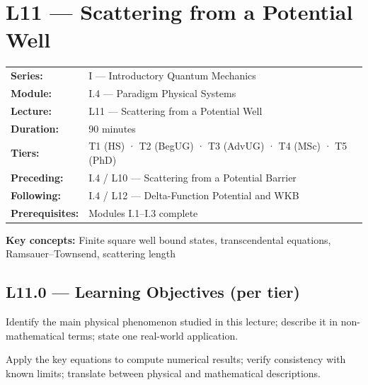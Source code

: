 \renewcommand{\lectureCode}{I.4 / L11}

\section*{L11 — Scattering from a Potential Well}
\label{sec:L11}

\begin{tcolorbox}[lecturebox, title={Module I.4 / L11 — Metadata}]
\begin{tabular}{@{}ll@{}}
\textbf{Series:}    & I — Introductory Quantum Mechanics \\
\textbf{Module:}    & I.4 — Paradigm Physical Systems \\
\textbf{Lecture:}   & L11 — Scattering from a Potential Well \\
\textbf{Duration:}  & 90 minutes \\
\textbf{Tiers:}     & T1 (HS) · T2 (BegUG) · T3 (AdvUG) · T4 (MSc) · T5 (PhD) \\
\textbf{Preceding:} & I.4 / L10 — Scattering from a Potential Barrier \\
\textbf{Following:} & I.4 / L12 — Delta-Function Potential and WKB \\
\textbf{Prerequisites:} & Modules I.1–I.3 complete \\
\end{tabular}

\medskip
\textbf{Key concepts:} Finite square well bound states, transcendental equations, Ramsauer–Townsend, scattering length
\end{tcolorbox}

\subsection*{L11.0 — Learning Objectives (per tier)}
\label{sec:L11.0}

\quad
Identify the main physical phenomenon studied in this lecture; describe it in
non-mathematical terms; state one real-world application.

\quad
Apply the key equations to compute numerical results; verify consistency with
known limits; translate between physical and mathematical descriptions.

